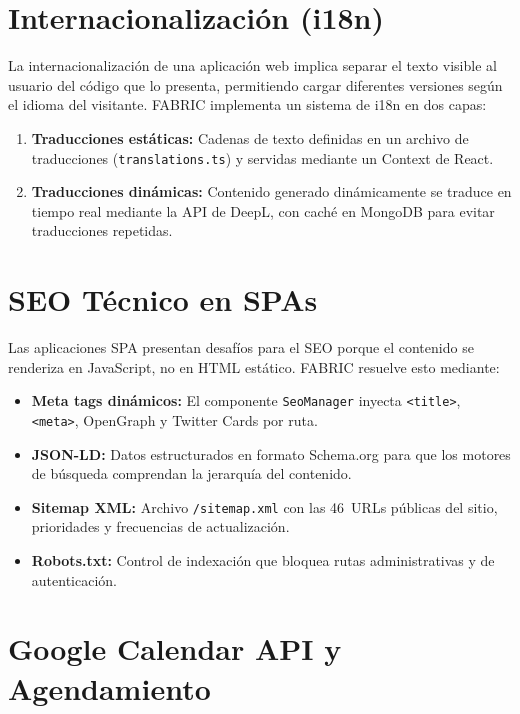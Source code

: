 \documentclass[12pt, a4paper, twoside]{report}
\begin{document}
\section{Internacionalización (i18n)}

La internacionalización de una aplicación web implica separar el texto visible al usuario del
código que lo presenta, permitiendo cargar diferentes versiones según el idioma del visitante.
FABRIC implementa un sistema de i18n en dos capas:

\begin{enumerate}
  \item \textbf{Traducciones estáticas:} Cadenas de texto definidas en un archivo de
        traducciones (\texttt{translations.ts}) y servidas mediante un Context de React.
  \item \textbf{Traducciones dinámicas:} Contenido generado dinámicamente se traduce en tiempo
        real mediante la API de DeepL, con caché en MongoDB para evitar traducciones repetidas.
\end{enumerate}

\section{SEO Técnico en SPAs}

Las aplicaciones SPA presentan desafíos para el SEO porque el contenido se renderiza en
JavaScript, no en HTML estático. FABRIC resuelve esto mediante:

\begin{itemize}
  \item \textbf{Meta tags dinámicos:} El componente \texttt{SeoManager} inyecta
        \texttt{<title>}, \texttt{<meta>}, OpenGraph y Twitter Cards por ruta.
  \item \textbf{JSON-LD:} Datos estructurados en formato Schema.org para que los motores de
        búsqueda comprendan la jerarquía del contenido.
  \item \textbf{Sitemap XML:} Archivo \texttt{/sitemap.xml} con las 46~URLs públicas del
        sitio, prioridades y frecuencias de actualización.
  \item \textbf{Robots.txt:} Control de indexación que bloquea rutas administrativas y de
        autenticación.
\end{itemize}

\section{Google Calendar API y Agendamiento}
\end{document}
